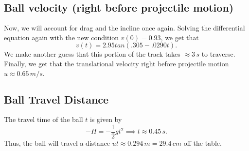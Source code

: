 \documentclass[12pt]{article} %
\begin{document}
\subsection{Ball velocity (right before projectile motion)}

Now, we will account for drag and the incline once again.
Solving the differential equation again with the new condition $v(0) = 0.93$, we get that $$v(t) = 2.95tan(.305 - .0290t).$$
We make another guess that this portion of the track takes $\approx 3\, s$ to traverse. Finally, we get that the translational velocity right before projectile motion $u \approx 0.65\, m/s$.

\subsection{Ball Travel Distance}

The travel time of the ball $t$ is given by
$$-H = -\frac{1}{2}gt^2 \implies t \approx 0.45\,s.$$
Thus, the ball will travel a distance $ut \approx 0.294\,m = 29.4\,cm$ off the table.
\end{document}
